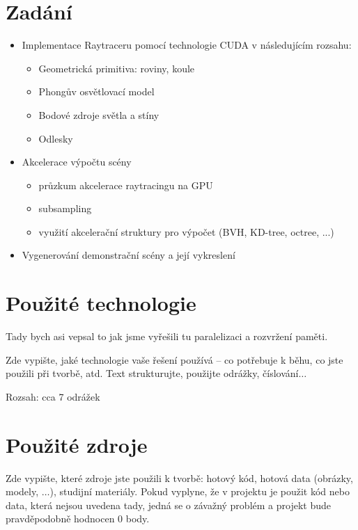 \documentclass[11pt,a4paper]{article}
\begin{document}
\titlepageandcontents

\section{Zadání}

\begin{itemize}
	\item Implementace Raytraceru pomocí technologie CUDA v následujícím rozsahu:
	\begin{itemize}
		\item Geometrická primitiva: roviny, koule
		\item Phongův osvětlovací model
		\item Bodové zdroje světla a stíny
		\item Odlesky
	\end{itemize}
	\item Akcelerace výpočtu scény
	\begin{itemize}
		\item průzkum akcelerace raytracingu na GPU
		\item subsampling
		\item využití akcelerační struktury pro výpočet (BVH, KD-tree, octree, ...)
	\end{itemize}
	\item Vygenerování demonstrační scény a její vykreslení
\end{itemize}

\section{Použité technologie}

Tady bych asi vepsal to jak jsme vyřešili tu paralelizaci a rozvržení paměti.

Zde vypište, jaké technologie vaše řešení používá – co potřebuje k běhu, co
jste použili při tvorbě, atd. Text strukturujte, použijte odrážky,
číslování$\ldots$

Rozsah: cca 7 odrážek

\section{Použité zdroje}

Zde vypište, které zdroje jste použili k tvorbě: hotový kód, hotová data
(obrázky, modely, $\ldots$), studijní materiály. Pokud vyplyne, že v projektu
je použit kód nebo data, která nejsou uvedena tady, jedná se o závažný problém
a projekt bude pravděpodobně hodnocen 0 body.
\end{document}
